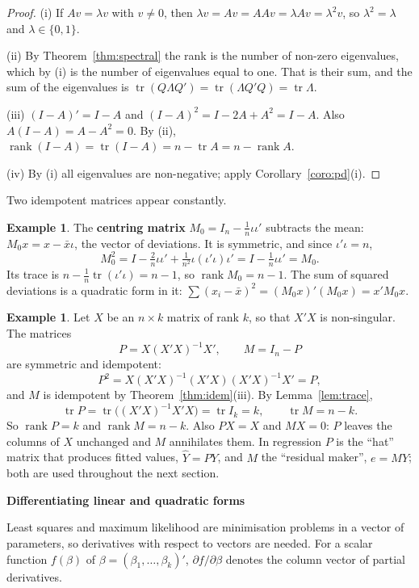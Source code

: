 \documentclass[11pt,a4paper]{article}
\numberwithin{equation}{section}
\DeclareMathOperator{\tr}{tr}
\DeclareMathOperator{\rank}{rank}
\theoremstyle{definition}
\newtheorem{exa}[thm]{Example}
\newcommand{\subhead}[1]{%
  \par\medskip\noindent\textbf{#1}\par\nobreak\smallskip}
\begin{document}
\begin{proof}
(i) If $Av = \lambda v$ with $v \neq 0$, then $\lambda v = Av = AAv = \lambda Av = \lambda^2v$, so $\lambda^2 = \lambda$ and $\lambda \in \{0, 1\}$.

(ii) By Theorem~\ref{thm:spectral} the rank is the number of non-zero eigenvalues, which by (i) is the number of eigenvalues equal to one. That is
their sum, and the sum of the eigenvalues is $\tr(Q\Lambda Q') = \tr(\Lambda Q'Q) = \tr\Lambda$.

(iii) $(I - A)' = I - A$ and $(I - A)^2 = I - 2A + A^2 = I - A$. Also $A(I - A) = A - A^2 = 0$. By (ii),
$\rank(I - A) = \tr(I - A) = n - \tr A = n - \rank A$.

(iv) By (i) all eigenvalues are non-negative; apply Corollary~\ref{coro:pd}(i).
\end{proof}

Two idempotent matrices appear constantly.

\begin{exa}
\label{ex:centring}
The \textbf{centring matrix} $M_0 = I_n - \frac1n\iota\iota'$ subtracts the mean: $M_0x = x - \bar x\iota$, the vector of deviations. It is symmetric, and
since $\iota'\iota = n$,
\[
M_0^2 = I - \tfrac2n\iota\iota' + \tfrac{1}{n^2}\iota(\iota'\iota)\iota' = I - \tfrac1n\iota\iota' = M_0 .
\]
Its trace is $n - \frac1n\tr(\iota'\iota) = n - 1$, so $\rank M_0 = n - 1$. The sum of squared deviations is a quadratic form in it:
$\sum (x_i - \bar x)^2 = (M_0x)'(M_0x) = x'M_0x$.
\end{exa}

\begin{exa}
\label{ex:hatM}
Let $X$ be an $n \times k$ matrix of rank $k$, so that $X'X$ is non-singular. The matrices
\[
P = X(X'X)^{-1}X', \qquad M = I_n - P
\]
are symmetric and idempotent:
\[
P^2 = X(X'X)^{-1}(X'X)(X'X)^{-1}X' = P ,
\]
and $M$ is idempotent by Theorem~\ref{thm:idem}(iii). By Lemma~\ref{lem:trace},
\[
\tr P = \tr\bigl((X'X)^{-1}X'X\bigr) = \tr I_k = k, \qquad \tr M = n - k .
\]
So $\rank P = k$ and $\rank M = n - k$. Also $PX = X$ and $MX = 0$: $P$ leaves the columns of $X$ unchanged and $M$ annihilates them. In regression
$P$ is the ``hat'' matrix that produces fitted values, $\hat Y = PY$, and $M$ the ``residual maker'', $e = MY$; both are used throughout the next section.
\end{exa}

\subhead{Differentiating linear and quadratic forms}
Least squares and maximum likelihood are minimisation problems in a vector of parameters, so derivatives with respect to vectors are needed.
For a scalar function $f(\beta)$ of $\beta = (\beta_1, \dots, \beta_k)'$, $\partial f/\partial\beta$ denotes the column vector of partial derivatives.
\end{document}
